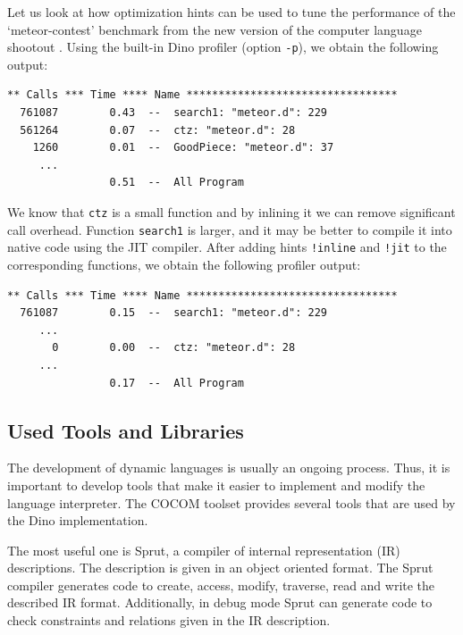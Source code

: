 \documentclass[preprint]{sigplanconf}
\begin{document}
Let us look at how optimization hints can be used to tune the performance of the
`meteor-contest'
benchmark from the new version of the computer language shootout \cite{Meteor}.
Using the built-in Dino profiler
(option {\tt -p}), we obtain the following output:

{\scriptsize
\begin{verbatim}
** Calls *** Time **** Name *********************************
  761087        0.43  --  search1: "meteor.d": 229
  561264        0.07  --  ctz: "meteor.d": 28
    1260        0.01  --  GoodPiece: "meteor.d": 37
     ...
                0.51  --  All Program
\end{verbatim}
}

We know that {\tt ctz} is a small function and by inlining it we can
remove significant call overhead.  Function {\tt search1} is larger, and it
may be better to compile it into native code using the JIT compiler.  After
adding hints {\tt !inline} and {\tt !jit} to the corresponding functions,
we obtain the
following profiler output:

{\scriptsize
\begin{verbatim}
** Calls *** Time **** Name *********************************
  761087        0.15  --  search1: "meteor.d": 229
     ...
       0        0.00  --  ctz: "meteor.d": 28
     ...
                0.17  --  All Program
\end{verbatim}
}


\subsection{Used Tools and Libraries}

The development of dynamic languages is usually an ongoing process.
Thus, it is important to develop tools that make it easier to implement
and modify the language interpreter. The COCOM toolset provides several
tools that are used by the Dino implementation.
%

The most useful one is Sprut, a compiler of internal representation (IR)
descriptions.  The description is given in an object oriented format.  The
Sprut compiler generates code to create, access, modify,
traverse, read and write the described IR format.  Additionally, in debug mode Sprut
can generate code to check constraints and relations given in the IR description.
\end{document}

